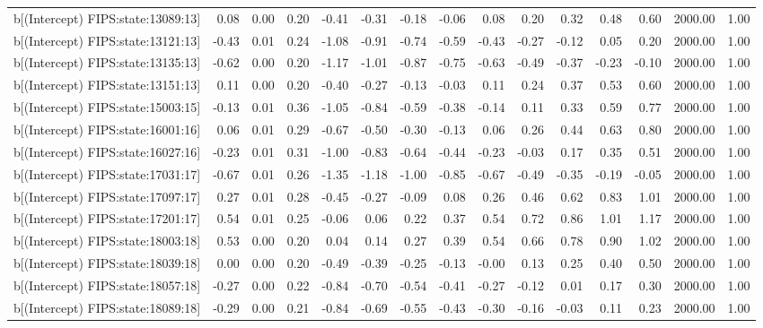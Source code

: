 \begin{table}[ht]
\begin{tabular}{rrrrrrrrrrrrrrr}
  b[(Intercept) FIPS:state:13089:13] & 0.08 & 0.00 & 0.20 & -0.41 & -0.31 & -0.18 & -0.06 & 0.08 & 0.20 & 0.32 & 0.48 & 0.60 & 2000.00 & 1.00 \\ 
  b[(Intercept) FIPS:state:13121:13] & -0.43 & 0.01 & 0.24 & -1.08 & -0.91 & -0.74 & -0.59 & -0.43 & -0.27 & -0.12 & 0.05 & 0.20 & 2000.00 & 1.00 \\ 
  b[(Intercept) FIPS:state:13135:13] & -0.62 & 0.00 & 0.20 & -1.17 & -1.01 & -0.87 & -0.75 & -0.63 & -0.49 & -0.37 & -0.23 & -0.10 & 2000.00 & 1.00 \\ 
  b[(Intercept) FIPS:state:13151:13] & 0.11 & 0.00 & 0.20 & -0.40 & -0.27 & -0.13 & -0.03 & 0.11 & 0.24 & 0.37 & 0.53 & 0.60 & 2000.00 & 1.00 \\ 
  b[(Intercept) FIPS:state:15003:15] & -0.13 & 0.01 & 0.36 & -1.05 & -0.84 & -0.59 & -0.38 & -0.14 & 0.11 & 0.33 & 0.59 & 0.77 & 2000.00 & 1.00 \\ 
  b[(Intercept) FIPS:state:16001:16] & 0.06 & 0.01 & 0.29 & -0.67 & -0.50 & -0.30 & -0.13 & 0.06 & 0.26 & 0.44 & 0.63 & 0.80 & 2000.00 & 1.00 \\ 
  b[(Intercept) FIPS:state:16027:16] & -0.23 & 0.01 & 0.31 & -1.00 & -0.83 & -0.64 & -0.44 & -0.23 & -0.03 & 0.17 & 0.35 & 0.51 & 2000.00 & 1.00 \\ 
  b[(Intercept) FIPS:state:17031:17] & -0.67 & 0.01 & 0.26 & -1.35 & -1.18 & -1.00 & -0.85 & -0.67 & -0.49 & -0.35 & -0.19 & -0.05 & 2000.00 & 1.00 \\ 
  b[(Intercept) FIPS:state:17097:17] & 0.27 & 0.01 & 0.28 & -0.45 & -0.27 & -0.09 & 0.08 & 0.26 & 0.46 & 0.62 & 0.83 & 1.01 & 2000.00 & 1.00 \\ 
  b[(Intercept) FIPS:state:17201:17] & 0.54 & 0.01 & 0.25 & -0.06 & 0.06 & 0.22 & 0.37 & 0.54 & 0.72 & 0.86 & 1.01 & 1.17 & 2000.00 & 1.00 \\ 
  b[(Intercept) FIPS:state:18003:18] & 0.53 & 0.00 & 0.20 & 0.04 & 0.14 & 0.27 & 0.39 & 0.54 & 0.66 & 0.78 & 0.90 & 1.02 & 2000.00 & 1.00 \\ 
  b[(Intercept) FIPS:state:18039:18] & 0.00 & 0.00 & 0.20 & -0.49 & -0.39 & -0.25 & -0.13 & -0.00 & 0.13 & 0.25 & 0.40 & 0.50 & 2000.00 & 1.00 \\ 
  b[(Intercept) FIPS:state:18057:18] & -0.27 & 0.00 & 0.22 & -0.84 & -0.70 & -0.54 & -0.41 & -0.27 & -0.12 & 0.01 & 0.17 & 0.30 & 2000.00 & 1.00 \\ 
  b[(Intercept) FIPS:state:18089:18] & -0.29 & 0.00 & 0.21 & -0.84 & -0.69 & -0.55 & -0.43 & -0.30 & -0.16 & -0.03 & 0.11 & 0.23 & 2000.00 & 1.00 \\ 

\end{tabular}
\end{table}
